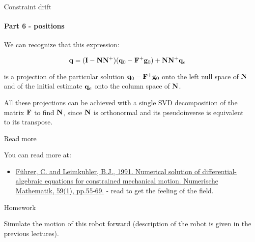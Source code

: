 \documentclass{beamer}
\begin{document}
\begin{frame}{Constraint drift}
\framesubtitle{Part 6 - positions}
\begin{flushleft}

We can recognize that this expression:

\begin{equation}
   \mathbf{q}  = (\mathbf{I} - \mathbf{N}\mathbf{N}^+) (\mathbf{q}_0 - \mathbf{F}^+\mathbf{g}_0) + \mathbf{N}\mathbf{N}^+\mathbf{q}_e
\end{equation}

is a projection of the particular solution $\mathbf{q}_0 - \mathbf{F}^+\mathbf{g}_0$ onto the left null space of $\mathbf{N}$ and of the initial estimate $\mathbf{q}_e$ onto the column space of $\mathbf{N}$.

\bigskip

All these projections can be achieved with a single SVD decomposition of the matrix $\mathbf{F}$ to find $\mathbf{N}$, since $\mathbf{N}$ is orthonormal and its pseudoinverse is equivalent to its transpose.

\end{flushleft}
\end{frame}




\begin{frame}{Read more}
\begin{flushleft}

You can read more at:

\begin{itemize}
    \item \href{https://idp.springer.com/authorize/casa?redirect_uri=https://link.springer.com/content/pdf/10.1007/BF01385770.pdf&casa_token=Qba9ilJAgVkAAAAA:qXdlKw8Au9f4ZzDqbNKCo5dg5q_vFeQVVCHqbshd1rmld1nKTUoaCzZR-w_SfgQYL9d_GqfhYZOyn5RpZw}{Führer, C. and Leimkuhler, B.J., 1991. Numerical solution of differential-algebraic equations for constrained mechanical motion. Numerische Mathematik, 59(1), pp.55-69.} - read to get the feeling of the field.
\end{itemize}

\end{flushleft}
\end{frame}


\begin{frame}{Homework}
\begin{flushleft}

Simulate the motion of this robot forward (description of the robot is given in the previous lectures).

\begin{figure}
    \centering
    
\end{figure}

\end{flushleft}
\end{frame}
\end{document}
